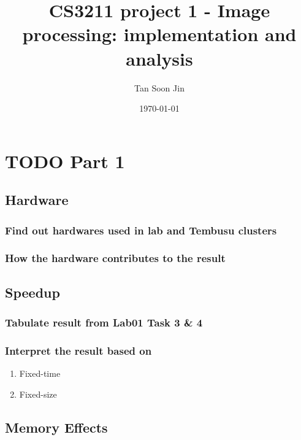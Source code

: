 \documentclass[11pt]{article}
\author{Tan Soon Jin}
\date{\today}
\title{CS3211 project 1 - Image processing: implementation and analysis}
\begin{document}
\maketitle
\tableofcontents


\section{{\bfseries\sffamily TODO} Part 1}
\label{sec:org5df01c3}

\subsection{Hardware}
\label{sec:org738a8d9}

\subsubsection{Find out hardwares used in lab and Tembusu clusters}
\label{sec:orgf74cbad}

\subsubsection{How the hardware contributes to the result}
\label{sec:org242fc21}

\subsection{Speedup}
\label{sec:org187e59c}

\subsubsection{Tabulate result from Lab01 Task 3 \& 4}
\label{sec:orge6452ed}

\subsubsection{Interpret the result based on}
\label{sec:org425c742}

\begin{enumerate}
\item Fixed-time
\label{sec:org8587b6e}

\item Fixed-size
\label{sec:org392dc5f}
\end{enumerate}

\subsection{Memory Effects}
\label{sec:orgfd7b0b7}
\end{document}
